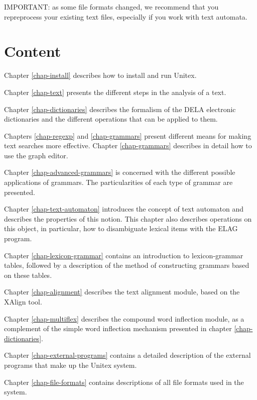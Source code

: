 \bigskip
\noindent IMPORTANT: as some file formats changed, we recommend that you
repreprocess your existing text files, especially if you work with text
automata.

\section*{Content}
\noindent Chapter \ref{chap-install} describes how to install and run
Unitex.

\bigskip \noindent Chapter \ref{chap-text} presents the different steps in the
analysis of  a text.

\bigskip \noindent Chapter \ref{chap-dictionaries} describes the formalism of
the DELA electronic dictionaries and the different operations that can be applied to them.

\bigskip \noindent Chapters \ref{chap-regexp} and \ref{chap-grammars}
present different means for making text searches more effective. 
Chapter \ref{chap-grammars} describes in detail how to use the graph
editor.

\bigskip \noindent Chapter \ref{chap-advanced-grammars} is concerned
with the different possible applications of grammars. The particularities of each type of grammar are
presented.

\bigskip \noindent Chapter \ref{chap-text-automaton} introduces the 
concept of text automaton and describes the properties of this notion. This chapter also describes 
operations on this object, in particular, how to disambiguate lexical items with
the ELAG program.

\bigskip \noindent Chapter \ref{chap-lexicon-grammar} contains an
introduction to lexicon-grammar tables, followed by a description of the method of constructing grammars based on these
tables.

\bigskip \noindent Chapter \ref{chap-alignment} describes the text
alignment module, based on the XAlign tool.

\bigskip \noindent Chapter \ref{chap-multiflex} describes the compound word
inflection module, as a complement of the simple word inflection mechanism
presented in chapter \ref{chap-dictionaries}.

\bigskip \noindent Chapter \ref{chap-external-programs} contains a
detailed description of the external programs that make up the Unitex system.

\bigskip \noindent Chapter \ref{chap-file-formats} contains
descriptions of all file formats used in the system. 


